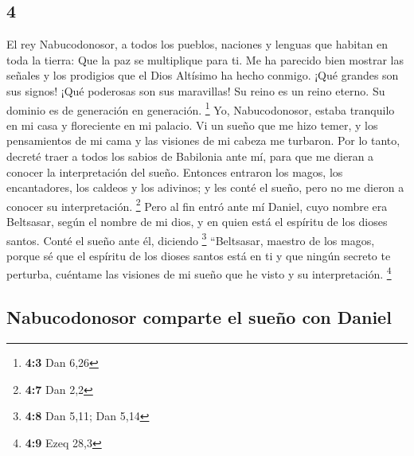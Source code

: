 \begin{paracol}{2}
\hypertarget{section-6}{%
\section{4}\label{section-6}}

 El rey Nabucodonosor, a todos los pueblos, naciones y
lenguas que habitan en toda la tierra: Que la paz se multiplique para
ti.  Me ha parecido bien mostrar las señales y los
prodigios que el Dios Altísimo ha hecho conmigo.  ¡Qué
grandes son sus signos! ¡Qué poderosas son sus maravillas! Su reino es
un reino eterno. Su dominio es de generación en generación. \footnote{\textbf{4:3}
  Dan 6,26}  Yo, Nabucodonosor, estaba tranquilo en mi
casa y floreciente en mi palacio.  Vi un sueño que me hizo
temer, y los pensamientos de mi cama y las visiones de mi cabeza me
turbaron.  Por lo tanto, decreté traer a todos los sabios
de Babilonia ante mí, para que me dieran a conocer la interpretación del
sueño.  Entonces entraron los magos, los encantadores, los
caldeos y los adivinos; y les conté el sueño, pero no me dieron a
conocer su interpretación. \footnote{\textbf{4:7} Dan 2,2}
 Pero al fin entró ante mí Daniel, cuyo nombre era
Beltsasar, según el nombre de mi dios, y en quien está el espíritu de
los dioses santos. Conté el sueño ante él, diciendo \footnote{\textbf{4:8}
  Dan 5,11; Dan 5,14}  ``Beltsasar, maestro de los magos,
porque sé que el espíritu de los dioses santos está en ti y que ningún
secreto te perturba, cuéntame las visiones de mi sueño que he visto y su
interpretación. \footnote{\textbf{4:9} Ezeq 28,3}

\hypertarget{nabucodonosor-comparte-el-sueuxf1o-con-daniel}{%
\subsection{Nabucodonosor comparte el sueño con
Daniel}\label{nabucodonosor-comparte-el-sueuxf1o-con-daniel}}


\end{paracol}
